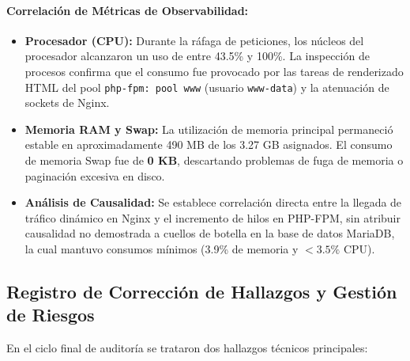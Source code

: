 \documentclass[12pt,a4paper]{article}
\begin{document}
\paragraph{Correlación de Métricas de Observabilidad:}
\begin{itemize}
    \item \textbf{Procesador (CPU):} Durante la ráfaga de peticiones, los núcleos del procesador alcanzaron un uso de entre 43.5\% y 100\%. La inspección de procesos confirma que el consumo fue provocado por las tareas de renderizado HTML del pool \texttt{php-fpm: pool www} (usuario \texttt{www-data}) y la atenuación de sockets de Nginx.
    \item \textbf{Memoria RAM y Swap:} La utilización de memoria principal permaneció estable en aproximadamente 490 MB de los 3.27 GB asignados. El consumo de memoria Swap fue de \textbf{0 KB}, descartando problemas de fuga de memoria o paginación excesiva en disco.
    \item \textbf{Análisis de Causalidad:} Se establece correlación directa entre la llegada de tráfico dinámico en Nginx y el incremento de hilos en PHP-FPM, sin atribuir causalidad no demostrada a cuellos de botella en la base de datos MariaDB, la cual mantuvo consumos mínimos (3.9\% de memoria y $<3.5\%$ CPU).
\end{itemize}

\subsection{Registro de Corrección de Hallazgos y Gestión de Riesgos}
En el ciclo final de auditoría se trataron dos hallazgos técnicos principales:
\end{document}
